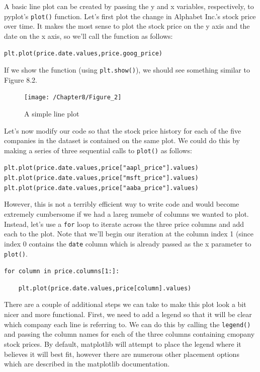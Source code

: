 \documentclass{book}
\begin{document}
A basic line plot can be created by passing the y and x variables, respectively, to pyplot's \texttt{plot()} function. Let's first plot the change in Alphabet Inc.'s stock price over time. It makes the most sense to plot the stock price on the y axis and the date on the x axis, so we'll call the function as follows:

\texttt{plt.plot(price.date.values,price.goog\_price)}

If we show the function (using \texttt{plt.show()}), we should see something similar to Figure 8.2. 

\begin{figure}[h]
	\caption{A simple line plot}
	\centering\texttt{[image: /Chapter8/Figure\_2]}
\end{figure}

Let's now modify our code so that the stock price history for each of the five companies in the dataset is contained on the same plot. We could do this by making a series of three sequential calls to \texttt{plot()} as follows:

\texttt{plt.plot(price.date.values,price["aapl\_price"].values)\\
	plt.plot(price.date.values,price["msft\_price"].values)\\
	plt.plot(price.date.values,price["aaba\_price"].values)}

However, this is not a terribly efficient way to write code and would become extremely cumbersome if we had a lareg numebr of columns we wanted to plot. Instead, let's use a \texttt{for} loop to iterate across the three price columns and add each to the plot. Note that we'll begin our iteration at the column index 1 (since index 0 contains the \texttt{date} column which is already passed as the x parameter to \texttt{plot()}.

\texttt{for column in price.columns[1:]:}

\texttt{~~~~plt.plot(price.date.values,price[column].values)}

There are a couple of additional steps we can take to make this plot look a bit nicer and more functional. First, we need to add a legend so that it will be clear which company each line is referring to. We can do this by calling the \texttt{legend()} and passing the column names for each of the three columns containing cmopany stock prices. By default, matplotlib will attempt to place the legend where it believes it will best fit, however there are numerous other placement options which are described in the matplotlib documentation.
\end{document}
